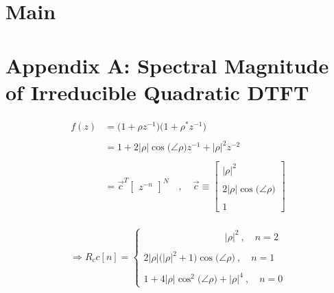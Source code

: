 \documentclass{article}
\begin{document}
\section{Main}

\newpage
\section*{Appendix A: Spectral Magnitude of Irreducible Quadratic DTFT}

\begin{align*}
    f(z)&= \big(1 + \rho z^{-1}\big)\big(1 + \rho^{*}z^{-1}\big) \\ \\
        &= 1 + 2\big|\rho\big|\cos\big(\angle{\rho}\big)z^{-1} + \big|\rho\big|^{2}z^{-2} \\ \\
        &=\vec{c}^{T}\begin{bmatrix} z^{-n} \end{bmatrix}^{N} \quad, \quad \vec{c} \equiv \begin{bmatrix}
                                                                                                                       \big|\rho\big|^{2} \\ \\
                                                                                                2\big|\rho\big|\cos\big(\angle{\rho}\big) \\ \\
                                                                                                                                        1
                                                                                            \end{bmatrix} \\
  \end{align*}

\begin{equation*}
    \Rightarrow R_cc[n] = \begin{cases}
                                \quad \quad \quad \quad \quad \quad \quad \quad \ \ \big|\rho\big|^{2} \ , \quad n = 2 \\ \\
                                2\big|\rho\big|\bigg(\big|\rho\big|^{2} + 1\bigg)\cos\big(\angle{\rho}\big) \ , \quad n = 1 \\ \\
                                1 + 4\big|\rho\big|\cos^{2}\big(\angle{\rho}\big) + \big|\rho\big|^{4} \ , \quad n = 0
                            \end{cases}
  \end{equation*}
\end{document}
